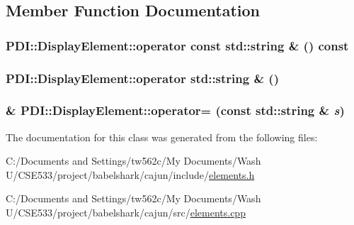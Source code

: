 \subsection{Member Function Documentation}
\hypertarget{class_p_d_i_1_1_display_element_c02068a967a182c0bf68a9200160329e}{
\subsubsection[{operator const std::string \&}]{\setlength{\rightskip}{0pt plus 5cm}PDI::DisplayElement::operator const std::string \& () const}}
\label{class_p_d_i_1_1_display_element_c02068a967a182c0bf68a9200160329e}


\hypertarget{class_p_d_i_1_1_display_element_9a1121388cac26aa246605ef60256b81}{
\subsubsection[{operator std::string \&}]{\setlength{\rightskip}{0pt plus 5cm}PDI::DisplayElement::operator std::string \& ()}}
\label{class_p_d_i_1_1_display_element_9a1121388cac26aa246605ef60256b81}


\hypertarget{class_p_d_i_1_1_display_element_fe9c487c7364aeb5d0dcef22890ca8ad}{
\subsubsection[{operator=}]{ \& PDI::DisplayElement::operator= (const std::string \& {\em s})}}
\label{class_p_d_i_1_1_display_element_fe9c487c7364aeb5d0dcef22890ca8ad}




The documentation for this class was generated from the following files:\begin{CompactItemize}
\item 
C:/Documents and Settings/tw562c/My Documents/Wash U/CSE533/project/babelshark/cajun/include/\hyperlink{elements_8h}{elements.h}\item 
C:/Documents and Settings/tw562c/My Documents/Wash U/CSE533/project/babelshark/cajun/src/\hyperlink{elements_8cpp}{elements.cpp}\end{CompactItemize}

